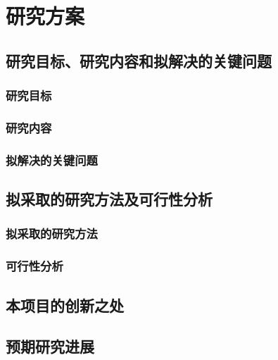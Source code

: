 \documentclass{ctexart}
\begin{document}
\section{研究方案}
\subsection{研究目标、研究内容和拟解决的关键问题}
\subsubsection{研究目标}
\subsubsection{研究内容}
\subsubsection{拟解决的关键问题}
\subsection{拟采取的研究方法及可行性分析}
\subsubsection{拟采取的研究方法}
\subsubsection{可行性分析}

\subsection{本项目的创新之处}
\subsection{预期研究进展}
\end{document}
